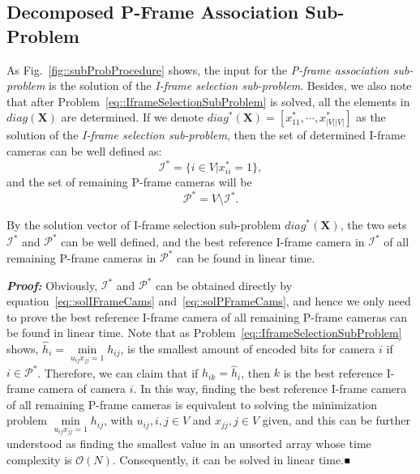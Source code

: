 \subsection{Decomposed P-Frame Association Sub-Problem}
\label{sec::PFrameScheduling}
As Fig.~\ref{fig::subProbProcedure} shows, the input for the \emph{P-frame association sub-problem} is the solution of the \emph{I-frame selection sub-problem}.
Besides, we also note that after Problem~\eqref{eq::IframeSelectionSubProblem} is solved, all the elements in $diag(\mathbf{X})$ are determined.
If we denote ${diag^*(\mathbf{X}) = \left[ x_{11}^*, \cdots, x_{|V||V|}^* \right]}$ as the solution of the \emph{I-frame selection sub-problem}, then the set of determined I-frame cameras can be well defined as:
\begin{equation}
\mathcal{I}^* = \{ i \in V | x_{ii}^* = 1\},
\label{eq::solIFrameCams}
\end{equation}
and the set of remaining P-frame cameras will be
\begin{equation}
\mathcal{P}^* = V \setminus \mathcal{I}^*.
\label{eq::solPFrameCams}
\end{equation} 
%
\begin{mylem}
By the solution vector of I-frame selection sub-problem $diag^*(\mathbf{X})$, the two sets $\mathcal{I}^*$ and $\mathcal{P}^*$ can be well defined, and the best reference I-frame camera in $\mathcal{I}^*$ of all remaining P-frame cameras in $\mathcal{P}^*$ can be found in linear time.
\label{lemma::findBestICamEasy}
\end{mylem}
\textbf{\emph{Proof:}}
Obviously, $\mathcal{I}^*$ and $\mathcal{P}^*$ can be obtained directly by equation~\eqref{eq::solIFrameCams} and~\eqref{eq::solPFrameCams}, and hence we only need to prove the best reference I-frame camera of all remaining P-frame cameras can be found in linear time.
Note that as Problem~\eqref{eq::IframeSelectionSubProblem} shows, ${\hat{h}_i = \underset{u_{ij}x_{jj} = 1}{\min} h_{ij}}$, is the smallest amount of encoded bits for camera $i$ if $i \in \mathcal{P}^*$.
Therefore, we can claim that if $h_{ik} = \hat{h}_i$, then $k$ is the best reference I-frame camera of camera $i$.
In this way, finding the best reference I-frame camera of all remaining P-frame cameras is equivalent to solving the minimization problem ${\underset{u_{ij}x_{jj} = 1}{\min} h_{ij}}$, with ${u_{ij}, i,j \in V}$ and ${x_{jj}, j \in V}$ given, and this can be further understood as finding the smallest value in an unsorted array whose time complexity is $\mathcal{O}(N)$.
Consequently, it can be solved in linear time.\hfill$\mathsmaller{\mathsmaller{\blacksquare}}$

